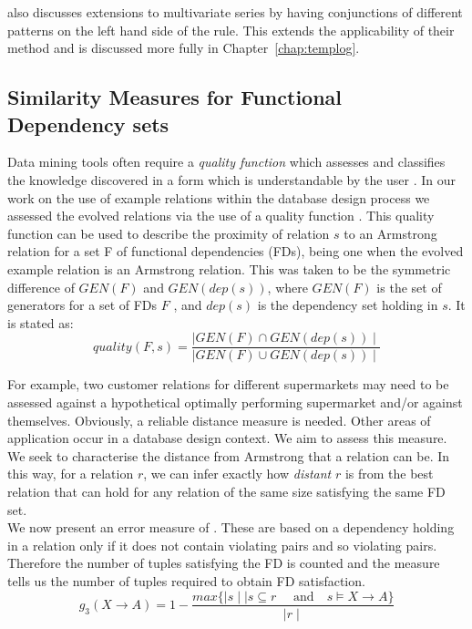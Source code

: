 \cite{dlm98} also discusses extensions to multivariate series by
having conjunctions of different patterns on the left hand side of the
rule. This extends the applicability of their method and is discussed
more fully in Chapter~\ref{chap:templog}.




\subsection{Similarity Measures for Functional Dependency sets}\label{subsec:rev_fd_sim}


Data mining tools often require a {\em quality function} which assesses
 and classifies the knowledge discovered in a form which is understandable
by the user \cite{hs94}. In our
work on the use of example relations within the database 
design process we assessed the evolved relations via the use
of a quality function \cite{cl96}. This quality function can
be used to describe the proximity of relation $s$ to an Armstrong relation for a set F of functional dependencies (FDs), being one when the evolved 
example relation is an Armstrong relation. This was taken to be the
 symmetric difference of $GEN(F)$ and $GEN(dep(s))$, where
$GEN(F)$ is the set of generators for a set of FDs $F$ \cite{mr86}, and
$dep(s)$ is the dependency set holding in $s$. It is stated as:
\begin{equation}\label{eq:quality}
quality(F, s) = \frac{\mid GEN(F) \cap GEN(dep(s)) \mid}{\mid GEN(F) \cup GEN(dep(s))\mid }
\end{equation}

For example, two customer
relations for different supermarkets may need to be assessed
against a hypothetical optimally performing supermarket and/or
against themselves. Obviously, a reliable distance measure
is needed. Other areas of application occur in a database design
context. We aim to assess this measure. We seek to characterise the distance 
from Armstrong that a relation
can be. In this way, for a relation $r$, we can infer exactly how
{\em distant} $r$ is from the best relation that can hold for any
relation of the same size satisfying the same FD set.\\

We now present an error measure of 
\cite{km95}.  These
are based on a dependency holding in a relation only if it does not
contain violating pairs and so violating pairs. Therefore the number
of tuples satisfying the FD is counted and the measure tells us the
number of tuples required to obtain FD satisfaction. 
\[
g_3(X \to A) = 1 - \frac{max \{ \mid s \mid \mid s \subseteq r
\quad\mbox{ and} \quad s \models X \to A \}}{\mid r \mid}
\]



